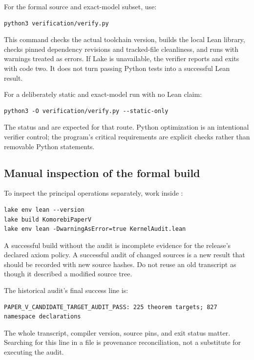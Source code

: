 For the formal source and exact-model subset, use:
\begin{Verbatim}[fontsize=\small,frame=leftline,breaklines=true]
python3 verification/verify.py
\end{Verbatim}
This command checks the actual toolchain version, builds the local Lean library, checks pinned dependency revisions and tracked-file cleanliness, and runs  with warnings treated as errors. If Lake is unavailable, the verifier reports  and exits with code two. It does not turn passing Python tests into a successful Lean result.

For a deliberately static and exact-model run with no Lean claim:
\begin{Verbatim}[fontsize=\small,frame=leftline,breaklines=true]
python3 -O verification/verify.py --static-only
\end{Verbatim}
The  status and  are expected for that route. Python optimization is an intentional verifier control; the program's critical requirements are explicit checks rather than removable Python  statements.

\subsection{Manual inspection of the formal build}
To inspect the principal operations separately, work inside :
\begin{Verbatim}[fontsize=\small,frame=leftline,breaklines=true]
lake env lean --version
lake build KomorebiPaperV
lake env lean -DwarningAsError=true KernelAudit.lean
\end{Verbatim}
A successful build without the audit is incomplete evidence for the release's declared axiom policy. A successful audit of changed sources is a new result that should be recorded with new source hashes. Do not reuse an old transcript as though it described a modified source tree.

The historical audit's final success line is:
\begin{Verbatim}[fontsize=\small,frame=leftline,breaklines=true]
PAPER_V_CANDIDATE_TARGET_AUDIT_PASS: 225 theorem targets; 827 namespace declarations
\end{Verbatim}
The whole transcript, compiler version, source pins, and exit status matter. Searching for this line in a file is provenance reconciliation, not a substitute for executing the audit.

